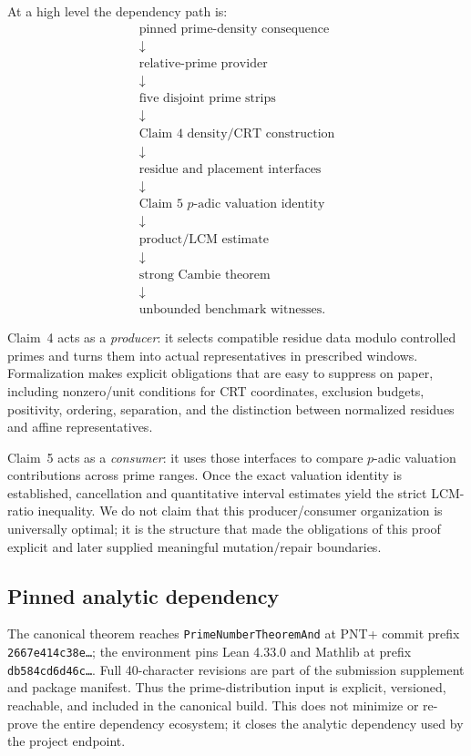 \documentclass[sigplan,10pt,anonymous,review]{acmart}
\newcommand{\code}[1]{\texttt{#1}}
\begin{document}
At a high level the dependency path is:
\[
\begin{array}{c}
\text{pinned prime-density consequence}\\
\downarrow\\
\text{relative-prime provider}\\
\downarrow\\
\text{five disjoint prime strips}\\
\downarrow\\
\text{Claim 4 density/CRT construction}\\
\downarrow\\
\text{residue and placement interfaces}\\
\downarrow\\
\text{Claim 5 $p$-adic valuation identity}\\
\downarrow\\
\text{product/LCM estimate}\\
\downarrow\\
\text{strong Cambie theorem}\\
\downarrow\\
\text{unbounded benchmark witnesses}.
\end{array}
\]

Claim~4 acts as a \emph{producer}: it selects compatible residue data modulo controlled primes and turns them into actual representatives in prescribed windows. Formalization makes explicit obligations that are easy to suppress on paper, including nonzero/unit conditions for CRT coordinates, exclusion budgets, positivity, ordering, separation, and the distinction between normalized residues and affine representatives.

Claim~5 acts as a \emph{consumer}: it uses those interfaces to compare $p$-adic valuation contributions across prime ranges. Once the exact valuation identity is established, cancellation and quantitative interval estimates yield the strict LCM-ratio inequality. We do not claim that this producer/consumer organization is universally optimal; it is the structure that made the obligations of this proof explicit and later supplied meaningful mutation/repair boundaries.

\subsection{Pinned analytic dependency}
The canonical theorem reaches \code{PrimeNumberTheoremAnd} at PNT+ commit prefix \code{2667e414c38e\ldots}; the environment pins Lean 4.33.0 and Mathlib at prefix \code{db584cd6d46c\ldots}. Full 40-character revisions are part of the submission supplement and package manifest.
Thus the prime-distribution input is explicit, versioned, reachable, and included in the canonical build. This does not minimize or re-prove the entire dependency ecosystem; it closes the analytic dependency used by the project endpoint.
\end{document}

